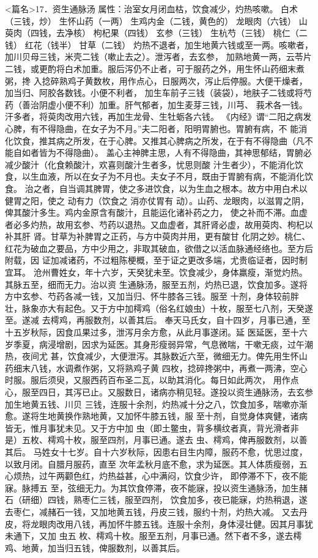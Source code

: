 \documentclass[a4paper,12pt,UTF8,twoside]{ctexbook}
\begin{document}
<篇名>17．资生通脉汤
属性：治室女月闭血枯，饮食减少，灼热咳嗽。 
白术（三钱，炒） 生怀山药（一两） 生鸡内金（二钱，黄色的） 龙眼肉（六钱） 山萸肉（四钱，去净核） 
枸杞果（四钱） 玄参（三钱） 生杭芍（三钱） 桃仁（二钱） 红花（钱半） 甘草（二钱） 
灼热不退者，加生地黄六钱或至一两。咳嗽者，加川贝母三钱，米壳二钱（嗽止去之）。泄泻者，去玄参， 
加熟地黄一两，云苓片二钱，或更酌将白术加重。服后泻仍不止者，可于服药之外，用生怀山药细末煮粥，搀 
入捻碎熟鸡子黄数枚，用作点心，日服两次，泻止后停服。大便干燥者，加当归、阿胶各数钱。小便不利者， 
加生车前子三钱（装袋），地肤子二钱或将芍药（善治阴虚小便不利）加重。肝气郁者，加生麦芽三钱，川芎、 
莪术各一钱。汗多者，将萸肉改用六钱，再加生龙骨、生牡蛎各六钱。 
《内经》谓“二阳之病发心脾，有不得隐曲，在女子为不月。”夫二阳者，阳明胃腑也。胃腑有病，不 
能消化饮食，推其病之所发，在于心脾。又推其心脾病之所发，在于有不得隐曲（凡不能自如者皆为不得隐曲）。 
盖心主神脾主思，人有不得隐曲，其神思郁结，胃腑必减少酸汁（化食赖酸汁，欢喜则酸汁生者多，忧思则酸 
汁生者少），不能消化饮食，以生血液，所以在女子为不月也。夫女子不月，既由于胃腑有病，不能消化饮食。 
治之者，自当调其脾胃，使之多进饮食，以为生血之根本。故方中用白术以健胃之阳，使之 动有力（饮食之 
消亦仗胃有 动）。山药、龙眼肉，以滋胃之阴，俾其酸汁多生。鸡内金原含有酸汁，且能运化诸补药之力， 
使之补而不滞。血虚者必多灼热，故用玄参、芍药以退热。又血虚者，其肝肾必虚，故用萸肉、枸杞以补其肝 
肾。甘草为补脾胃之正药，与方中萸肉并用，更有酸甘 
化阴之妙。桃仁、红花为破血之要品，方中少用之，非取其破血，欲借之以活血脉通经络也。至方后附载，因 
证加减诸药，不过粗陈梗概，至于证之更改多端，尤贵临证者，因时制宜耳。 
沧州曹姓女，年十六岁，天癸犹未至。饮食减少，身体羸瘦，渐觉灼热。其脉五至，细而无力。治以资 
生通脉汤，服至五剂，灼热已退，饮食加多。遂将方中玄参、芍药各减一钱，又加当归、怀牛膝各三钱。服至 
十剂，身体较前胖壮，脉象亦大有起色。又于方中加樗鸡（俗名红娘虫）十枚，服至七八剂，天癸遂至。遂减 
去樗鸡，再服数剂，以善其后。 
奉天马氏女，自十四岁，月事已通，至十五岁秋际，因食瓜果过多，泄泻月余方愈，从此月事遂闭。延 
医延医，至十六岁季夏，病浸增剧，因求为延医。其身形瘦弱异常，气息微喘，干嗽无痰，过午潮热，夜间尤 
甚，饮食减少，大便泄泻。其脉数近六至，微细无力。俾先用生怀山药细末八钱，水调煮作粥，又将熟鸡子黄 
四枚，捻碎搀粥中，再煮一两沸，空心时服。服后须臾，又服西药百布圣二瓦，以助其消化。每日如此两次， 
用作点心，服至四日，其泻已止。又服数日，诸病亦稍见轻。遂投以资生通脉汤，去玄参加生地黄五钱、川贝 
三钱，连服十余剂，灼热减十分之八，饮食加多，喘嗽亦渐愈。遂将生地黄换作熟地黄，又加怀牛膝五钱，服 
至十剂，自觉身体爽健，诸病皆无，惟月事犹未见。又于方中加 虫（即土鳖虫，背多横纹者真，背光滑者非 
是）五枚、樗鸡十枚，服至四剂，月事已通。遂去 虫、樗鸡，俾再服数剂，以善其后。 
马姓女十七岁。自十六岁秋际，因患右目生内障，服药不愈，忧思过度，以致月闭。自腊月服药，直至 
次年孟秋月底不愈，求为延医。其人体质瘦弱，五心烦热，过午两颧色红，灼热益甚，心中满闷，饮食少许， 
即停滞不下，夜不能寐。脉搏五 
至，弦细无力。为其饮食停滞，夜不能寐，投以资生通脉汤，加生赭石（研细）四钱，熟枣仁三钱，服至四剂， 
饮食加多，夜已能寐，灼热稍退，遂去枣仁，减赭石一钱，又加地黄五钱，丹皮三钱，服约十剂，灼热大减。 
又去丹皮，将龙眼肉改用八钱，再加怀牛膝五钱。连服十余剂，身体浸壮健。因其月事犹未通下，又加 虫五 
枚、樗鸡十枚。服至五剂，月事已通。然下者不多，遂去樗鸡、地黄，加当归五钱，俾服数剂，以善其后。 
\end{document}
